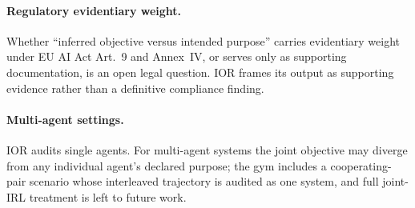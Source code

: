 \paragraph{Regulatory evidentiary weight.}
Whether ``inferred objective versus intended purpose'' carries evidentiary weight
under EU AI Act Art.~9 and Annex~IV, or serves only as supporting documentation, is
an open legal question. IOR frames its output as supporting evidence rather than a
definitive compliance finding.

\paragraph{Multi-agent settings.}
IOR audits single agents. For multi-agent systems the joint objective may diverge
from any individual agent's declared purpose; the gym includes a cooperating-pair
scenario whose interleaved trajectory is audited as one system, and full joint-IRL
treatment is left to future work.
